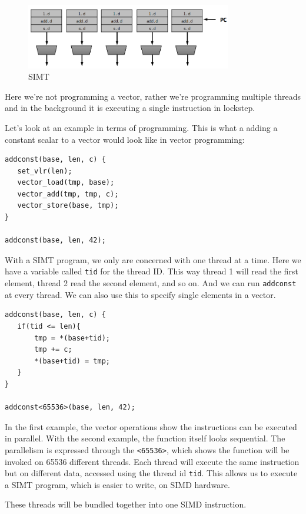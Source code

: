 \documentclass{article}
\begin{document}
 \begin{figure}[ht!]
\centering
\includegraphics[width=90mm]{img/SIMT.png}
\caption{SIMT}
\end{figure}

Here we're not programming a vector, rather we're programming multiple threads and in the background it is executing a single instruction in lockstep. 

Let's look at an example in terms of programming. This is what a adding a constant scalar to a vector would look like in vector programming:

\scriptsize
\begin{verbatim}
addconst(base, len, c) {
   set_vlr(len);
   vector_load(tmp, base);
   vector_add(tmp, tmp, c);
   vector_store(base, tmp);
}

addconst(base, len, 42);
\end{verbatim}
\normalsize 

With a SIMT program, we only are concerned with one thread at a time. Here we have a variable called \texttt{tid} for the thread ID. This way thread 1 will read the first element, thread 2 read the second element, and so on. And we can run \texttt{addconst} at every thread. We can also use this to specify single elements in a vector.

\scriptsize
\begin{verbatim}
addconst(base, len, c) {
   if(tid <= len){
   	   tmp = *(base+tid);
   	   tmp += c;
   	   *(base+tid) = tmp;
   }
}

addconst<65536>(base, len, 42);
\end{verbatim}
\normalsize 

In the first example, the vector operations show the instructions can be executed in parallel. With the second example, the function itself looks sequential. The parallelism is expressed through the \texttt{<65536>}, which shows the function will be invoked on 65536 different threads. Each thread will execute the same instruction but on different data, accessed using the thread id \texttt{tid}. This allows us to execute a SIMT program, which is easier to write, on SIMD hardware.

These threads will be bundled together into one SIMD instruction. 
\end{document}

